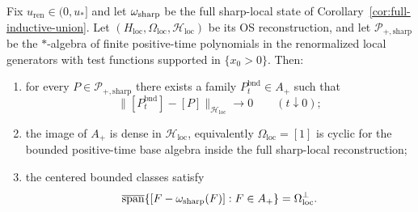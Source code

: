 \begin{theorem}\label{thm:bounded-base-cyclicity}
Fix $u_{\mathrm{ren}}\in(0,u_*]$ and let $\omega_{\mathrm{sharp}}$ be the full sharp-local state of Corollary~\ref{cor:full-inductive-union}. Let $(H_{\mathrm{loc}},\Omega_{\mathrm{loc}},\mathcal H_{\mathrm{loc}})$ be its OS reconstruction, and let $\mathcal P_{+,\mathrm{sharp}}$ be the $\ast$-algebra of finite positive-time polynomials in the renormalized local generators with test functions supported in $\{x_0>0\}$. Then:
\begin{enumerate}[label=\textup{(\roman*)},leftmargin=2.25em]
\item for every $P\in\mathcal P_{+,\mathrm{sharp}}$ there exists a family $P_t^{\mathrm{bnd}}\in A_+$ such that
\[
\|[P_t^{\mathrm{bnd}}]-[P]\|_{\mathcal H_{\mathrm{loc}}}\longrightarrow 0\qquad (t\downarrow 0);
\]
\item the image of $A_+$ is dense in $\mathcal H_{\mathrm{loc}}$, equivalently $\Omega_{\mathrm{loc}}=[1]$ is cyclic for the bounded positive-time base algebra inside the full sharp-local reconstruction;
\item the centered bounded classes satisfy
\[
\overline{\operatorname{span}}\{[F-\omega_{\mathrm{sharp}}(F)]:F\in A_+\}=\Omega_{\mathrm{loc}}^{\perp}.
\]
\end{enumerate}
\end{theorem}

